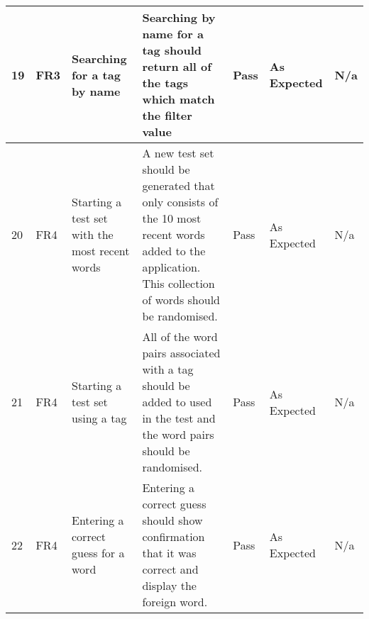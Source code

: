 \documentclass[paper=a4, fontsize=11pt]{scrartcl}	%
\numberwithin{equation}{section}															%
\numberwithin{figure}{section}																%
\numberwithin{table}{section}
\begin{document}
\begin{landscape}
\begin{longtable}{|l|p{2cm}|p{5cm}|p{5cm}|l|p{5cm}|p{5cm}|}
19 & FR3                    & Searching for a tag by name                          & Searching by name for a tag should return all of the tags which match the filter value                                                                                                                                                     & Pass      & As Expected                                        & N/a                                                                                                                                                                                                                        \\ \hline
20 & FR4                    & Starting a test set with the most recent words       & A new test set should be generated that only consists of the 10 most recent words added to the application. This collection of words should be randomised.                                                                                 & Pass      & As Expected                                        & N/a                                                                                                                                                                                                                        \\ \hline
21 & FR4                    & Starting a test set using a tag                      & All of the word pairs associated with a tag should be added to used in the test and the word pairs should be randomised.                                                                                                                   & Pass      & As Expected                                        & N/a                                                                                                                                                                                                                        \\ \hline
22 & FR4                    & Entering a correct guess for a word                  & Entering a correct guess should show confirmation that it was correct and display the foreign word.                                                                                                                                        & Pass      & As Expected                                        & N/a                                                                                                                                                                                                                        \\ \hline

\end{longtable}
\end{landscape}
\end{document}

